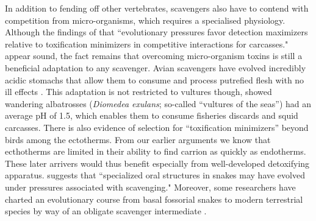 \documentclass[a4paper,12pt]{article}
\begin{document}
In addition to fending off other vertebrates, scavengers also have to contend with competition from micro-organisms, which requires a specialised physiology. 
Although the findings of \cite{shivik2006vultures} that ``evolutionary pressures favor detection maximizers relative to toxification minimizers in competitive interactions for carcasses." appear sound, the fact remains that overcoming micro-organism toxins is still a beneficial adaptation to any scavenger. 
Avian scavengers have evolved incredibly acidic stomachs that allow them to consume and process putrefied flesh with no ill effects \citep{houston1975digestive,roggenbuck2014microbiome}. 
This adaptation is not restricted to vultures though, \cite{gremillet2012vultures} showed wandering albatrosses (\textit{Diomedea exulans}; so-called ``vultures of the seas'') had an average pH of 1.5, which enables them to consume fisheries discards and squid carcasses. 
There is also evidence of selection for ``toxification minimizers'' beyond birds among the ectotherms.
From our earlier arguments we know that ecthotherms are limited in their ability to find carrion as quickly as endotherms. 
These later arrivers would thus benefit especially from well-developed detoxifying apparatus. 
\cite{shivik2006vultures} suggests that ``specialized oral structures in snakes may have evolved under pressures associated with scavenging."
Moreover, some researchers have charted an evolutionary course from basal fossorial snakes to modern terrestrial species by way of an obligate scavenger intermediate \citep{bauchot2006snakes}. 
\end{document}
